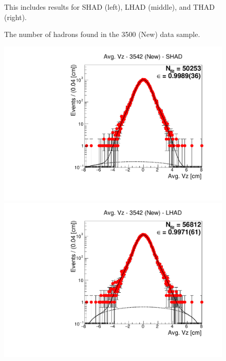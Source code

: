 \begin{figure}[H]
\caption{The number of hadrons found in the 3500 (New) data sample.}
{This includes results for SHAD (left), LHAD (middle), and THAD (right).}
\label{fig:hadron_fits_3500_new}
\end{figure}


\begin{figure}[H]
\centering
\includegraphics[scale=0.25]{figures/plots/nonDDbar_fit_results/3650_new/fit_new_3542_data_SHAD.pdf}
\hspace{-0.5cm}
\includegraphics[scale=0.25]{figures/plots/nonDDbar_fit_results/3650_new/fit_new_3542_data_LHAD.pdf}
\hspace{-0.5cm}

\end{figure}

